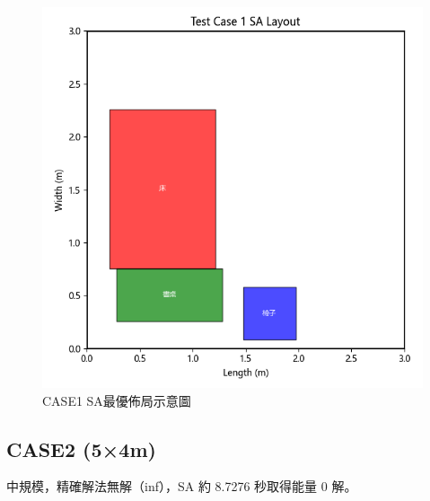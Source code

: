 \documentclass[conference]{IEEEtran}
\begin{document}
\begin{figure}[!htbp]
    \centering
    \includegraphics[width=\columnwidth]{sa_layout_test_case_1.png} 
    \caption{CASE1 SA最優佈局示意圖}
    \label{fig:case1_exact_solver} %
\end{figure}

\FloatBarrier %

\subsection{CASE2 (5×4m)}
中規模，精確解法無解（inf），SA 約 8.7276 秒取得能量 0 解。
\end{document}

